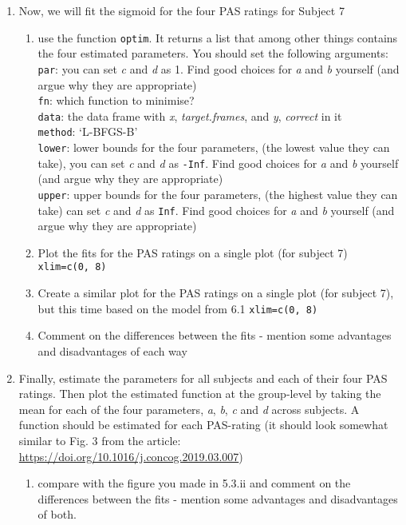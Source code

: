 \documentclass[
]{article}
\providecommand{\tightlist}{%
  \setlength{\itemsep}{0pt}\setlength{\parskip}{0pt}}
\begin{document}
\begin{enumerate}
\def\labelenumi{\arabic{enumi})}
\tightlist
\item
  Now, we will fit the sigmoid for the four PAS ratings for Subject 7

  \begin{enumerate}
  \def\labelenumii{\roman{enumii}.}
  \tightlist
  \item
    use the function \texttt{optim}. It returns a list that among other
    things contains the four estimated parameters. You should set the
    following arguments:\\
    \texttt{par}: you can set \emph{c} and \emph{d} as 1. Find good
    choices for \emph{a} and \emph{b} yourself (and argue why they are
    appropriate)\\
    \texttt{fn}: which function to minimise?\\
    \texttt{data}: the data frame with \emph{x}, \emph{target.frames},
    and \emph{y}, \emph{correct} in it\\
    \texttt{method}: `L-BFGS-B'\\
    \texttt{lower}: lower bounds for the four parameters, (the lowest
    value they can take), you can set \emph{c} and \emph{d} as
    \texttt{-Inf}. Find good choices for \emph{a} and \emph{b} yourself
    (and argue why they are appropriate)\\
    \texttt{upper}: upper bounds for the four parameters, (the highest
    value they can take) can set \emph{c} and \emph{d} as \texttt{Inf}.
    Find good choices for \emph{a} and \emph{b} yourself (and argue why
    they are appropriate)\\
  \item
    Plot the fits for the PAS ratings on a single plot (for subject 7)
    \texttt{xlim=c(0,\ 8)}
  \item
    Create a similar plot for the PAS ratings on a single plot (for
    subject 7), but this time based on the model from 6.1
    \texttt{xlim=c(0,\ 8)}\\
  \item
    Comment on the differences between the fits - mention some
    advantages and disadvantages of each way\\
  \end{enumerate}
\item
  Finally, estimate the parameters for all subjects and each of their
  four PAS ratings. Then plot the estimated function at the group-level
  by taking the mean for each of the four parameters, \emph{a},
  \emph{b}, \emph{c} and \emph{d} across subjects. A function should be
  estimated for each PAS-rating (it should look somewhat similar to Fig.
  3 from the article:
  \url{https://doi.org/10.1016/j.concog.2019.03.007})

  \begin{enumerate}
  \def\labelenumii{\roman{enumii}.}
  \tightlist
  \item
    compare with the figure you made in 5.3.ii and comment on the
    differences between the fits - mention some advantages and
    disadvantages of both.
  \end{enumerate}
\end{enumerate}
\end{document}

